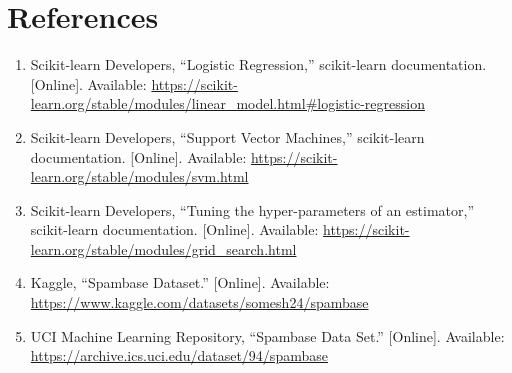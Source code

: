 \documentclass[12pt,a4paper]{article}
\begin{document}
\section{References}
\begin{enumerate}
\item Scikit-learn Developers, ``Logistic Regression,'' scikit-learn documentation. [Online].
Available: \url{https://scikit-learn.org/stable/modules/linear_model.html#logistic-regression}
\item Scikit-learn Developers, ``Support Vector Machines,'' scikit-learn documentation. [Online].
Available: \url{https://scikit-learn.org/stable/modules/svm.html}
\item Scikit-learn Developers, ``Tuning the hyper-parameters of an estimator,'' scikit-learn
documentation. [Online]. Available:
\url{https://scikit-learn.org/stable/modules/grid_search.html}
\item Kaggle, ``Spambase Dataset.'' [Online]. Available:
\url{https://www.kaggle.com/datasets/somesh24/spambase}
\item UCI Machine Learning Repository, ``Spambase Data Set.'' [Online]. Available:
\url{https://archive.ics.uci.edu/dataset/94/spambase}
\end{enumerate}
\end{document}
